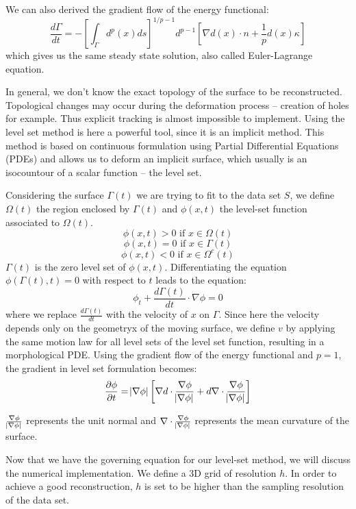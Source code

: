 \documentclass[12pt]{article}
\begin{document}
We can also derived the gradient flow of the energy functional:
$$\frac{d\Gamma}{dt} = -\left[\int_{\Gamma} d^p(x)ds\right]^{1/p - 1}d^{p-1}[\nabla d(x) \cdot n +\frac{1}{p}d(x)\kappa]$$
which gives us the same steady state solution, also called Euler-Lagrange equation.

In general, we don't know the exact topology of the surface to be reconstructed. Topological changes may occur during the deformation process -- creation of holes for example. Thus explicit tracking is almost impossible to implement. Using the level set method is here a powerful tool, since it is an implicit method. This method is based on continuous formulation using Partial Differential Equations (PDEs) and allows us to deform an implicit surface, which usually is an isocountour of a scalar function -- the level set.

Considering the surface $\Gamma(t)$ we are trying to fit to the data set $S$, we define $\Omega(t)$ the region enclosed by $\Gamma(t)$ and $\phi(x,t)$ the level-set function associated to $\Omega(t)$.
$$\phi(x,t) > 0\text{ if } x\in\Omega(t)$$
$$\phi(x,t) = 0\text{ if } x\in\Gamma(t)$$
$$\phi(x,t) < 0\text{ if } x\in\Omega^c(t)$$
$\Gamma(t)$ is the zero level set of $\phi(x,t)$. Differentiating the equation $\phi(\Gamma(t),t) = 0$ with respect to $t$ leads to the equation:
$$\phi_t + \frac{d\Gamma(t)}{dt}\cdot\nabla\phi = 0$$
where we replace $\frac{d\Gamma(t)}{dt}$ with the velocity of $x$ on $\Gamma$. Since here the velocity depends only on the geometryx of the moving surface, we define $v$ by applying the same motion law for all level sets of the level set function, resulting in a morphological PDE. Using the gradient flow of the energy functional and $p = 1$, the gradient in level set formulation becomes:
$$\frac{\partial\phi}{\partial t} = \abs{\nabla\phi}\left[\nabla d \cdot \frac{\nabla\phi}{\abs{\nabla\phi}} + d\nabla\cdot\frac{\nabla\phi}{\abs{\nabla\phi}}\right]$$

$\frac{\nabla\phi}{\abs{\nabla\phi}}$ represents the unit normal and $\nabla\cdot\frac{\nabla\phi}{\abs{\nabla\phi}}$ represents the mean curvature of the surface.

Now that we have the governing equation for our level-set method, we will discuss the numerical implementation. We define a 3D grid of resolution $h$. In order to achieve a good reconstruction, $h$ is set to be higher than the sampling resolution of the data set.
\end{document}
